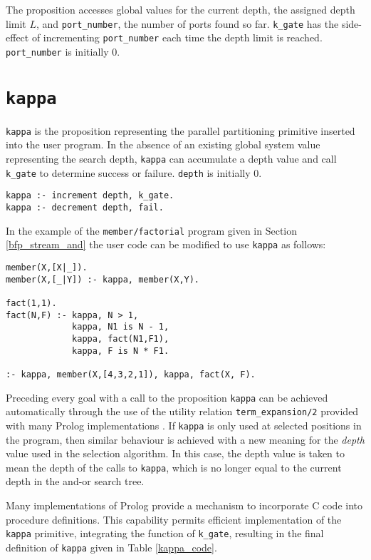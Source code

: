 The proposition accesses global values for the current depth, the
assigned depth limit $L$, and \texttt{port\_{}number},
the number of ports found so far.  \texttt{k\_{}gate} has the side-effect
of incrementing \texttt{port\_{}number} each time the depth limit is reached.
\texttt{port\_{}number} is initially 0.

\section{\texttt{kappa}} %

\texttt{kappa} is the proposition representing the parallel partitioning
primitive inserted into the user program.  In the absence of an existing
global system value representing the search depth, \texttt{kappa} can
accumulate a depth value and call \texttt{k\_{}gate} to determine
success or failure.  \texttt{depth} is initially 0.
\begin{verbatim}
kappa :- increment depth, k_gate.
kappa :- decrement depth, fail.
\end{verbatim}
In the example of the \texttt{member/factorial} program given in Section
\ref{bfp_stream_and}
the user code can be modified to use \texttt{kappa} as follows:
\begin{verbatim}
member(X,[X|_]).
member(X,[_|Y]) :- kappa, member(X,Y).

fact(1,1).
fact(N,F) :- kappa, N > 1,
             kappa, N1 is N - 1,
             kappa, fact(N1,F1),
             kappa, F is N * F1.
             
:- kappa, member(X,[4,3,2,1]), kappa, fact(X, F).
\end{verbatim}
Preceding every goal with a call to the proposition \texttt{kappa} can
be achieved automatically through the use of the utility relation
\texttt{term\_{}expansion/2} provided with many Prolog implementations
\cite{BBP+94}.  If \texttt{kappa} is only used at selected positions
in the program, then similar behaviour is achieved with a new
meaning for the \textit{depth} value used in the selection 
algorithm.  In this case, the depth value is taken to mean the depth
of the calls to \texttt{kappa}, which is no longer equal to the
current depth in the and-or search tree.

Many implementations of Prolog provide a mechanism to incorporate C
code into procedure definitions.  This capability permits efficient
implementation of the \texttt{kappa} primitive, integrating the
function of \texttt{k\_{}gate}, resulting in the final definition
of \texttt{kappa} given in Table \ref{kappa_code}.

